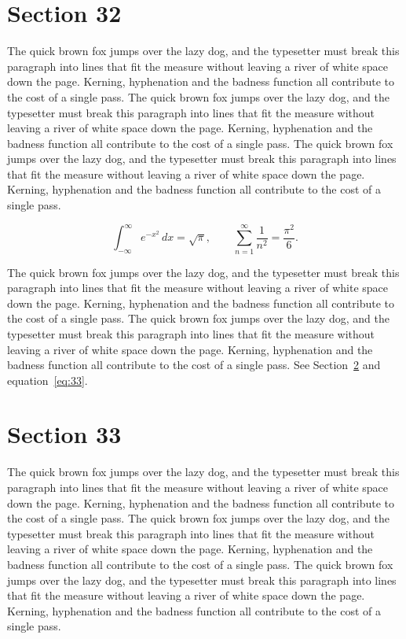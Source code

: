 \documentclass{article}
\begin{document}
\section{Section 32}
\label{sec:32}
The quick brown fox jumps over the lazy dog, and the typesetter must break this paragraph into lines that fit the measure without leaving a river of white space down the page. Kerning, hyphenation and the badness function all contribute to the cost of a single pass. The quick brown fox jumps over the lazy dog, and the typesetter must break this paragraph into lines that fit the measure without leaving a river of white space down the page. Kerning, hyphenation and the badness function all contribute to the cost of a single pass. The quick brown fox jumps over the lazy dog, and the typesetter must break this paragraph into lines that fit the measure without leaving a river of white space down the page. Kerning, hyphenation and the badness function all contribute to the cost of a single pass. 

\begin{equation}\label{eq:32}
\int_{-\infty}^{\infty} e^{-x^{2}}\,dx = \sqrt{\pi}, \qquad
\sum_{n=1}^{\infty} \frac{1}{n^{2}} = \frac{\pi^{2}}{6}.
\end{equation}

The quick brown fox jumps over the lazy dog, and the typesetter must break this paragraph into lines that fit the measure without leaving a river of white space down the page. Kerning, hyphenation and the badness function all contribute to the cost of a single pass. The quick brown fox jumps over the lazy dog, and the typesetter must break this paragraph into lines that fit the measure without leaving a river of white space down the page. Kerning, hyphenation and the badness function all contribute to the cost of a single pass. 
See Section~\ref{sec:33} and equation~\eqref{eq:33}.
\section{Section 33}
\label{sec:33}
The quick brown fox jumps over the lazy dog, and the typesetter must break this paragraph into lines that fit the measure without leaving a river of white space down the page. Kerning, hyphenation and the badness function all contribute to the cost of a single pass. The quick brown fox jumps over the lazy dog, and the typesetter must break this paragraph into lines that fit the measure without leaving a river of white space down the page. Kerning, hyphenation and the badness function all contribute to the cost of a single pass. The quick brown fox jumps over the lazy dog, and the typesetter must break this paragraph into lines that fit the measure without leaving a river of white space down the page. Kerning, hyphenation and the badness function all contribute to the cost of a single pass. 
\end{document}
